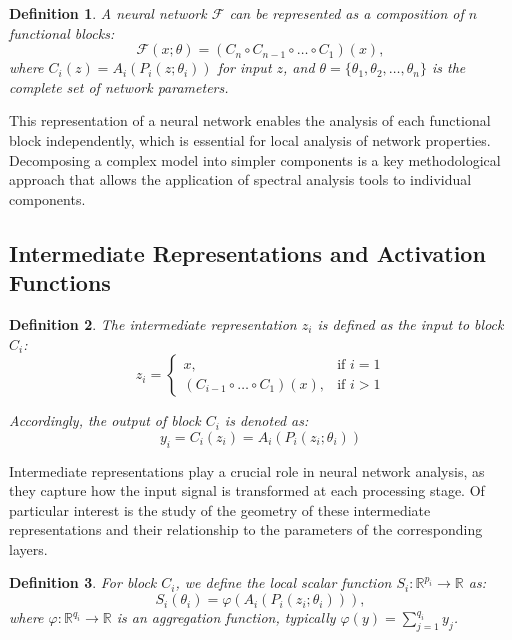 \documentclass[a4paper,12pt]{article}
\newtheorem{definition}{Definition}
\begin{document}
\begin{definition}
  A neural network $\mathcal{F}$ can be represented as a composition of $n$ functional blocks:
  \begin{equation}
    \mathcal{F}(x; \theta) = (C_n \circ C_{n-1} \circ \ldots \circ C_1)(x),
  \end{equation}
  where $C_i(z) = A_i(P_i(z; \theta_i))$ for input $z$, and $\theta = \{\theta_1, \theta_2, \ldots,
  \theta_n\}$ is the complete set of network parameters.
\end{definition}

This representation of a neural network enables the analysis of each functional block independently, which is
essential for local analysis of network properties. Decomposing a complex model into simpler components is a
key methodological approach that allows the application of spectral analysis tools to individual components.

\subsection{Intermediate Representations and Activation Functions}

\begin{definition}
  The intermediate representation $z_i$ is defined as the input to block $C_i$:
  \begin{equation}
    z_i =
    \begin{cases}
      x, & \text{if } i = 1 \\
      (C_{i-1} \circ \ldots \circ C_1)(x), & \text{if } i > 1
    \end{cases}
  \end{equation}

  Accordingly, the output of block $C_i$ is denoted as:
  \begin{equation}
    y_i = C_i(z_i) = A_i(P_i(z_i; \theta_i))
  \end{equation}
\end{definition}

Intermediate representations play a crucial role in neural network analysis, as they capture how the input
signal is transformed at each processing stage. Of particular interest is the study of the geometry of these
intermediate representations and their relationship to the parameters of the corresponding layers.

\begin{definition}
  For block $C_i$, we define the local scalar function $S_i: \mathbb{R}^{p_i} \rightarrow \mathbb{R}$ as:
  \begin{equation}
    S_i(\theta_i) = \varphi(A_i(P_i(z_i; \theta_i))),
  \end{equation}
  where $\varphi: \mathbb{R}^{q_i} \rightarrow \mathbb{R}$ is an aggregation function, typically $\varphi(y)
  = \sum_{j=1}^{q_i} y_j$.
\end{definition}
\end{document}
